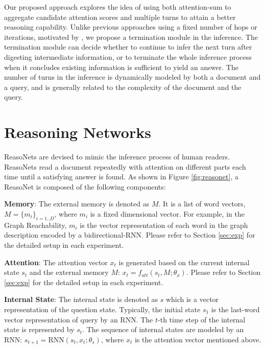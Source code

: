 \documentclass[sigconf]{acmart}
\begin{document}
Our proposed approach explores the idea of using both attention-sum to aggregate candidate attention scores and multiple turns to attain a better reasoning capability. Unlike previous approaches using a fixed number of hops or iterations, motivated by \cite{nogueira2016nips, mnih2014recurrent}, we propose a termination module in the inference. The termination module can decide whether to continue to infer the next turn after digesting intermediate information, or to terminate the whole inference process when it concludes existing information is sufficient to yield an answer. The number of turns in the inference is dynamically modeled by both a document and a query, and is generally related to the complexity of the document and the query.



\section{Reasoning Networks}
\label{sec:reasoning_net}
ReasoNets are devised to mimic the inference process of human readers. ReasoNets read a document repeatedly with attention on different parts each time until a satisfying answer is found. As shown in Figure \ref{fig:reasonet}, a ReasoNet is composed of the following components:


\textbf{Memory}: The external memory is denoted as $M$. It is a list of word vectors, $M = \{m_i \}_{i=1..D}$, where $m_i$ is a fixed dimensional vector. For example, in the Graph Reachability, $m_i$ is the vector representation of each word in the graph description encoded by a bidirectional-RNN. Please refer to Section \ref{sec:exp} for the detailed setup in each experiment.

\textbf{Attention}: The attention vector $x_t$ is generated based on the current internal state $s_t$ and the external memory $M$: $x_t = f_{att}(s_t, M; \theta_x)$. Please refer to Section \ref{sec:exp} for the detailed setup in each experiment.

\textbf{Internal State}: The internal state is denoted as $s$ which is a vector representation of the question state. Typically, the initial state $s_1$ is the last-word vector representation of query by an RNN. The $t$-th time step of the internal state is represented by $s_t$. The sequence of internal states are modeled by an RNN: 
$s_{t+1} = \text{RNN}(s_t, x_t; \theta_s)$, 
where $x_t$ is the attention vector mentioned above. 
\end{document}
